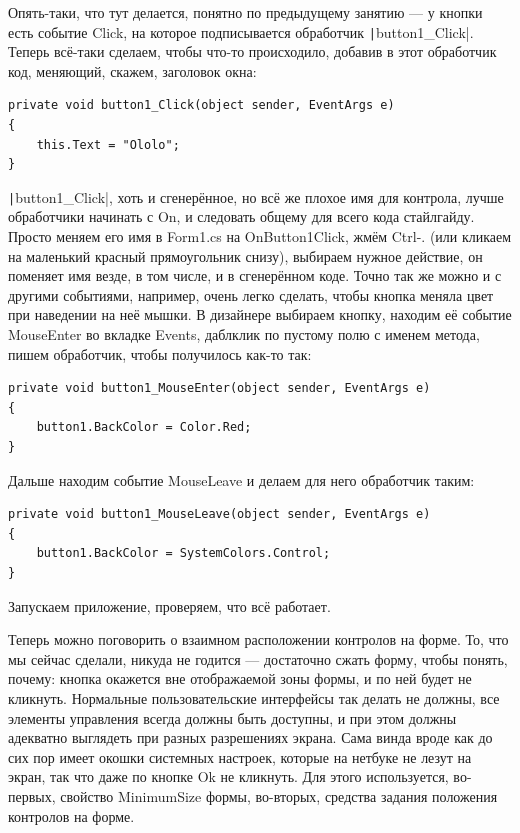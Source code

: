 \documentclass[a5paper]{article}
\begin{document}
Опять-таки, что тут делается, понятно по предыдущему занятию --- у кнопки есть событие Click, на которое подписывается обработчик \texttt|button1_Click|. Теперь всё-таки сделаем, чтобы что-то происходило, добавив в этот обработчик код, меняющий, скажем, заголовок окна:

\begin{verbatim}
private void button1_Click(object sender, EventArgs e)
{
    this.Text = "Ololo";
}
\end{verbatim}

\texttt|button1_Click|, хоть и сгенерённое, но всё же плохое имя для контрола, лучше обработчики начинать с On, и следовать общему для всего кода стайлгайду. Просто меняем его имя в Form1.cs на OnButton1Click, жмём Ctrl-. (или кликаем на маленький красный прямоугольник снизу), выбираем нужное действие, он поменяет имя везде, в том числе, и в сгенерённом коде. Точно так же можно и с другими событиями, например, очень легко сделать, чтобы кнопка меняла цвет при наведении на неё мышки. В дизайнере выбираем кнопку, находим её событие MouseEnter во вкладке Events, даблклик по пустому полю с именем метода, пишем обработчик, чтобы получилось как-то так:

\begin{verbatim}
private void button1_MouseEnter(object sender, EventArgs e)
{
    button1.BackColor = Color.Red;
}
\end{verbatim}

Дальше находим событие MouseLeave и делаем для него обработчик таким:

\begin{verbatim}
private void button1_MouseLeave(object sender, EventArgs e)
{
    button1.BackColor = SystemColors.Control;
}
\end{verbatim}

Запускаем приложение, проверяем, что всё работает.

Теперь можно поговорить о взаимном расположении контролов на форме. То, что мы сейчас сделали, никуда не годится --- достаточно сжать форму, чтобы понять, почему: кнопка окажется вне отображаемой зоны формы, и по ней будет не кликнуть. Нормальные пользовательские интерфейсы так делать не должны, все элементы управления всегда должны быть доступны, и при этом должны адекватно выглядеть при разных разрешениях экрана. Сама винда вроде как до сих пор имеет окошки системных настроек, которые на нетбуке не лезут на экран, так что даже по кнопке Ok не кликнуть. Для этого используется, во-первых, свойство MinimumSize формы, во-вторых, средства задания положения контролов на форме. 
\end{document}
